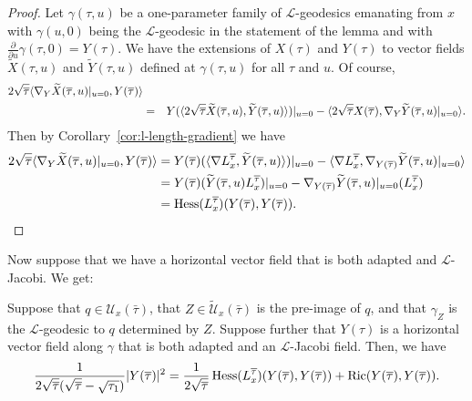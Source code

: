 \begin{proof}
\sketch
{}
Let $\gamma(\tau,u)$ be a one-parameter family of ${\mathcal
L}$-geodesics emanating from $x$ with $\gamma(u,0)$ being the
${\mathcal L}$-geodesic in the statement of the lemma  and with
$\frac{\partial}{\partial u}\gamma(\tau,0)=Y(\tau)$. We have the
extensions of $X(\tau)$ and $Y(\tau)$ to vector fields $\widetilde
X(\tau,u)$ and $\widetilde Y(\tau,u)$ defined at $\gamma(\tau,u)$
for all $\tau$ and $u$. Of course,
\begin{eqnarray*}
2\sqrt{\overline\tau}\langle \nabla_Y\widetilde
X(\overline\tau,u)|_{u=0},Y(\overline\tau)\rangle  \\
& = & Y(\langle 2\sqrt{\overline\tau}\widetilde X(\overline\tau,u),\widetilde
Y(\overline\tau,u)\rangle)|_{u=0}-\langle
2\sqrt{\overline\tau}X(\overline\tau),\nabla_Y\widetilde
Y(\overline\tau,u)|_{u=0}\rangle.\end{eqnarray*} Then by
Corollary~\ref{cor:l-length-gradient} we have
\begin{align*}
2\sqrt{\overline\tau}\langle \nabla_Y\widetilde
X(\overline\tau,u)|_{u=0},Y(\overline\tau)\rangle & = Y(\overline\tau)(\langle
\nabla L_x^{\overline\tau},\widetilde
Y(\overline\tau,u)\rangle)|_{u=0}-\langle \nabla
L_x^{\overline\tau},\nabla_{Y(\overline\tau)}\widetilde
Y(\overline\tau,u)|_{u=0}\rangle
\\
& = Y(\overline\tau)(\widetilde Y(\overline\tau,u)
L_x^{\overline\tau})|_{u=0}-\nabla_{Y(\overline\tau)}\widetilde
Y(\overline\tau,u)|_{u=0}(L_x^{\overline\tau}) \\ & =  \operatorname{Hess}(L_x^{\overline\tau})(Y(\overline\tau),Y(\overline\tau)).
\end{align*}
\end{proof}


Now suppose that we have a horizontal vector field that is both
adapted and ${\mathcal L}$-Jacobi. We get:

\begin{lemma}\label{lem:adapted-jacobi-hessian-relation}
\label{adapjab}

Suppose that $q\in {\mathcal U}_x(\bar\tau)$, that $Z\in \widetilde
{\mathcal U}_x(\bar\tau)$ is the pre-image of $q$, and that
$\gamma_Z$ is the  ${\mathcal L}$-geodesic to $q$ determined by $Z$.
Suppose further that $Y(\tau)$ is a horizontal vector field along
$\gamma$ that is both adapted and an ${\mathcal L}$-Jacobi field.
Then,  we have
$$\frac{1}{2\sqrt{\overline\tau}(\sqrt{\overline\tau}-\sqrt{\tau_1})}|Y(\overline\tau)|^2
=\frac{1}{2\sqrt{\overline\tau}}\operatorname{Hess}(L_x^{\overline\tau})(Y(\overline\tau),Y(\overline\tau))+\operatorname{Ric}(Y(\overline\tau),Y(\overline\tau)).$$
\end{lemma}

